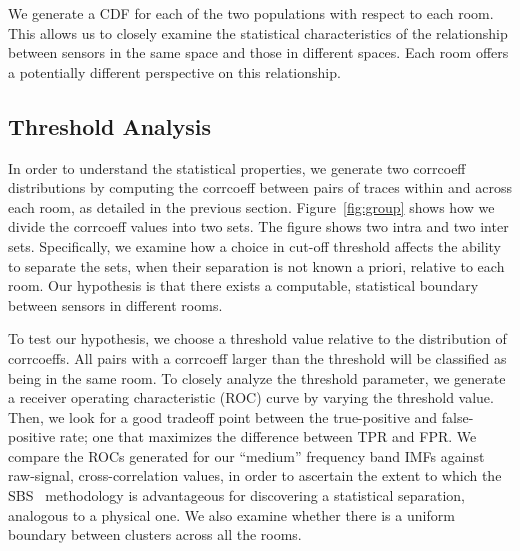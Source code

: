 We generate a CDF for each of the two populations with respect to each room.  
This allows us to closely examine the statistical characteristics 
of the relationship between sensors in the same space and those in different spaces.  Each room offers a potentially different 
perspective on this relationship.


\subsection{Threshold Analysis}
In order to understand the statistical properties, we generate two corrcoeff distributions by computing the corrcoeff between pairs of traces within and across each room, as detailed in the previous section.
Figure~\ref{fig:group} shows how we divide the corrcoeff values into two sets.
The figure shows two intra and two inter sets. Specifically, we examine how a choice in cut-off threshold affects the ability
to separate the sets, when their separation is not known a priori, relative to each room.
Our hypothesis is that there exists a computable, statistical boundary between sensors in different rooms.

To test our hypothesis, we choose a threshold value relative to the distribution of corrcoeffs.  
All pairs with a corrcoeff larger than the threshold will be classified as being in the same room.  To closely analyze the threshold parameter, 
we generate a receiver operating characteristic (ROC) curve by varying the threshold value.  Then, we look for a good tradeoff point between the true-positive and false-positive rate; one that maximizes the difference between TPR and FPR.  We compare the ROCs generated 
for our ``medium'' frequency band IMFs against raw-signal, cross-correlation values, in order to ascertain the extent to which 
the SBS~\cite{SBS} methodology is advantageous for discovering a statistical separation, analogous to a physical one.
We also examine whether there is a uniform boundary between clusters across all the rooms. 


